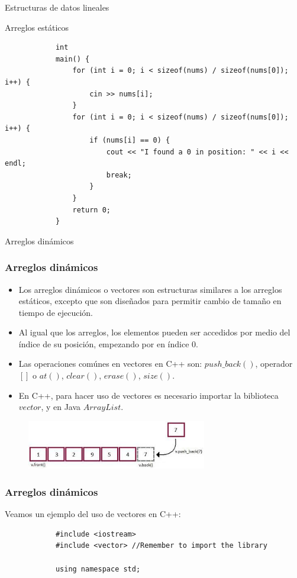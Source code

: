 \documentclass{beamer}
\begin{document}
\begin{section}{Estructuras de datos lineales}
\begin{subsection}{Arreglos estáticos}
\begin{frame}[fragile]
\begin{lstlisting}
			int
			main() {
			    for (int i = 0; i < sizeof(nums) / sizeof(nums[0]); i++) {
			        cin >> nums[i];
			    }
			    for (int i = 0; i < sizeof(nums) / sizeof(nums[0]); i++) {
			        if (nums[i] == 0) {
			            cout << "I found a 0 in position: " << i << endl;
			            break;
			        }
			    }
			    return 0;
			}
		\end{lstlisting}		
	\end{frame}	
\end{subsection}
\begin{subsection}{Arreglos dinámicos}
	\begin{frame}[fragile]
		\frametitle{Arreglos dinámicos}
		\begin{itemize}
			\item {Los arreglos dinámicos o vectores son estructuras similares a los arreglos estáticos, excepto que son diseñados para permitir cambio de tamaño en tiempo de ejecución.}
			\item {Al igual que los arreglos, los elementos pueden ser accedidos por medio del índice de su posición, empezando por en índice 0.}
			\item {Las operaciones comúnes en vectores en C++ son: $push\_back()$, operador $[]$ o $at()$, $clear()$, $erase()$, $size()$.}
			\item {En C++, para hacer uso de vectores es necesario importar la biblioteca $vector$, y en Java $ArrayList$.}
		\end{itemize}
		\begin{figure}
			\includegraphics[width = 0.7\textwidth]{src/vector.jpg}
		\end{figure}
	\end{frame}
	
	\begin{frame}[fragile]
		\frametitle{Arreglos dinámicos}
		Veamos un ejemplo del uso de vectores en C++:
		\begin{lstlisting}
			#include <iostream>
			#include <vector> //Remember to import the library

			using namespace std;
			

\end{lstlisting}
\end{frame}
\end{subsection}
\end{section}
\end{document}
